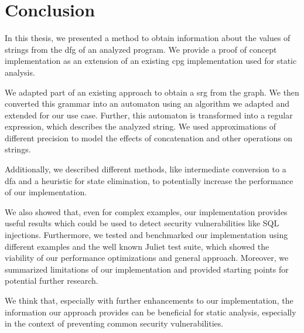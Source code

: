 \chapter{Conclusion}\label{chapter:Conclusion}

In this thesis, we presented a method to obtain information about the values of strings from the \acl{dfg} of an analyzed program. We provide a proof of concept implementation as an extension of an existing \acl{cpg} implementation used for static analysis.

We adapted part of an existing approach to obtain a \acl{srg} from the graph. We then converted this grammar into an automaton using an algorithm we adapted and extended for our use case.
Further, this automaton is transformed into a regular expression, which describes the analyzed string. We used approximations of different precision to model the effects of concatenation and other operations on strings.

Additionally, we described different methods, like intermediate conversion to a \ac{dfa} and a heuristic for state elimination, to potentially increase the performance of our implementation.

We also showed that, even for complex examples, our implementation provides useful results which could be used to detect security vulnerabilities like SQL injections.
Furthermore, we tested and benchmarked our implementation using different examples and the well known Juliet test suite, which showed the viability of our performance optimizations and general approach.
Moreover, we summarized limitations of our implementation and provided starting points for potential further research.

We think that, especially with further enhancements to our implementation, the information our approach provides can be beneficial for static analysis, especially in the context of preventing common security vulnerabilities.

\begin{comment}	
Summarize your main contributions and observations. Further research directions?

$\leq 1$ page
content...
\end{comment}